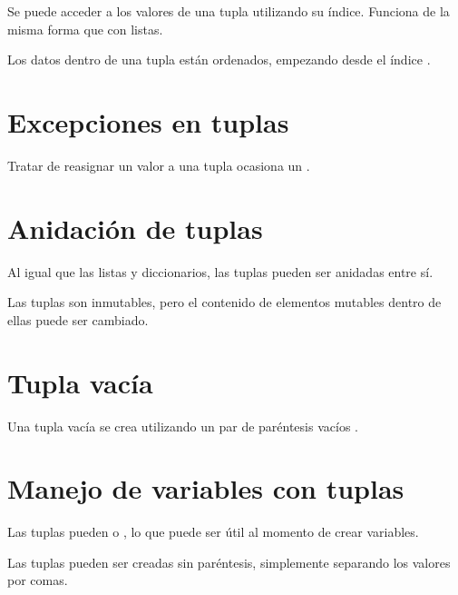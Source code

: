 Se puede acceder a los valores de una tupla utilizando su índice.
Funciona de la misma forma que con listas.


Los datos dentro de una tupla están ordenados, empezando desde el índice .

\section{Excepciones en tuplas}

Tratar de reasignar un valor a una tupla ocasiona un .


\section{Anidación de tuplas}

Al igual que las listas y diccionarios, las tuplas pueden ser anidadas entre sí.
\medskip

Las tuplas son inmutables, pero el contenido de elementos mutables dentro de ellas puede ser cambiado.


\section{Tupla vacía}

Una tupla vacía se crea utilizando un par de paréntesis vacíos \ttt{()}.


\section{Manejo de variables con tuplas}

Las tuplas pueden  o , lo que puede ser útil al momento de crear variables.


Las tuplas pueden ser creadas sin paréntesis, simplemente separando los valores por comas.

